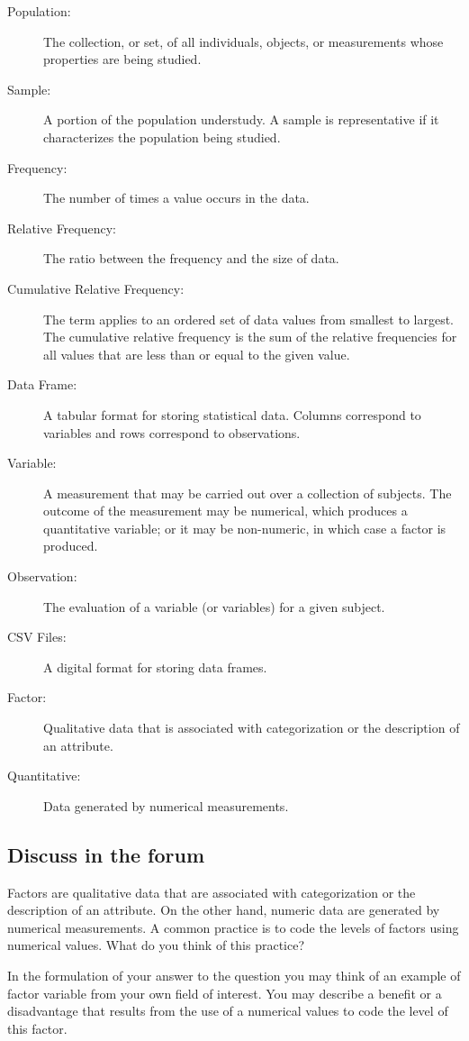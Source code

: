 \documentclass[]{krantz}
\theoremstyle{definition}
\theoremstyle{definition}
\theoremstyle{definition}
\theoremstyle{remark}
\begin{document}
\begin{description}
\item[Population:]
The collection, or set, of all individuals, objects, or measurements
whose properties are being studied.
\item[Sample:]
A portion of the population understudy. A sample is representative
if it characterizes the population being studied.
\item[Frequency:]
The number of times a value occurs in the data.
\item[Relative Frequency:]
The ratio between the frequency and the size of data.
\item[Cumulative Relative Frequency:]
The term applies to an ordered set of data values from smallest to
largest. The cumulative relative frequency is the sum of the
relative frequencies for all values that are less than or equal to
the given value.
\item[Data Frame:]
A tabular format for storing statistical data. Columns correspond to
variables and rows correspond to observations.
\item[Variable:]
A measurement that may be carried out over a collection of subjects.
The outcome of the measurement may be numerical, which produces a
quantitative variable; or it may be non-numeric, in which case a
factor is produced.
\item[Observation:]
The evaluation of a variable (or variables) for a given subject.
\item[CSV Files:]
A digital format for storing data frames.
\item[Factor:]
Qualitative data that is associated with categorization or the
description of an attribute.
\item[Quantitative:]
Data generated by numerical measurements.
\end{description}

\hypertarget{discuss-in-the-forum}{%
\subsection*{Discuss in the forum}\label{discuss-in-the-forum}}


Factors are qualitative data that are associated with categorization or
the description of an attribute. On the other hand, numeric data are
generated by numerical measurements. A common practice is to code the
levels of factors using numerical values. What do you think of this
practice?

In the formulation of your answer to the question you may think of an
example of factor variable from your own field of interest. You may
describe a benefit or a disadvantage that results from the use of a
numerical values to code the level of this factor.
\end{document}
